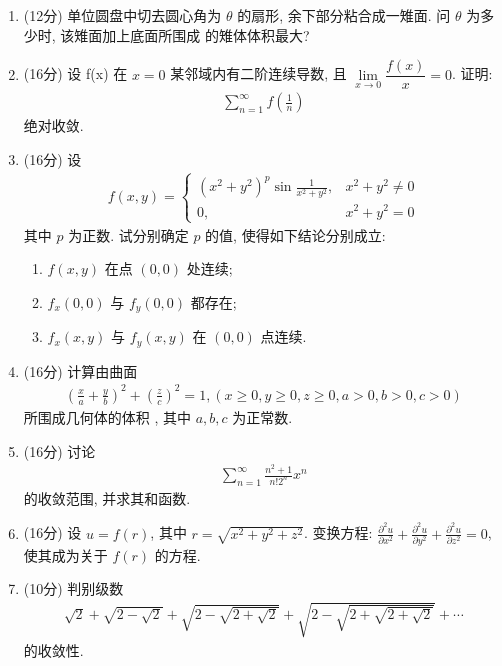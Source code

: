 \documentclass[space]{ctexart} %
\def\geq{\geqslant}
\begin{document}
\begin{enumerate}[itemsep=1.5em,label=\arabic*.,topsep=0pt,left=0em]
\begin{enumerate}[itemsep=1em,label=(\arabic*),topsep=0pt,left=2em]
\end{enumerate}



\item (12分) 单位圆盘中切去圆心角为  $\theta$  的扇形, 余下部分粘合成一雉面. 问  $\theta$ 为多少时, 该雉面加上底面所围成
的雉体体积最大?

\item (16分) 设 f(x) 在 $x=0$ 某邻域内有二阶连续导数, 且 $\lim\limits_{x \rightarrow 0} \dfrac{f(x)}{x}=0$.  证明:
\begin{align*}
    \sum_{n=1}^{\infty} f\left(\frac{1}{n}\right)
\end{align*}
绝对收敛.

\item (16分) 设
\begin{align*}
    f(x, y)=\begin{cases}
\left(x^{2}+y^{2}\right)^{p} \sin \frac{1}{x^{2}+y^{2}}, & x^{2}+y^{2} \neq 0 \\
0, & x^{2}+y^{2}=0
\end{cases}
\end{align*}
其中  $p$ 为正数. 试分别确定 $p$ 的值, 使得如下结论分别成立:
\begin{enumerate}[itemsep=0em,label=(\arabic*),topsep=0pt,left=0em]
\item  $f(x, y)$  在点  $(0,0)$  处连续;
\item   $f_{x}(0,0)$  与  $f_{y}(0,0)$  都存在;
\item   $f_{x}(x, y)$  与  $f_{y}(x, y)$  在  $(0,0)$  点连续.
\end{enumerate}

\item (16分) 计算由曲面
\begin{align*}
    \left(\frac{x}{a}+\frac{y}{b}\right)^{2}+\left(\frac{z}{c}\right)^{2}=1,(x \geq 0, y \geq 0, z \geq 0, a>0, b>0, c>0)
\end{align*}
所围成几何体的体积 , 其中 $a,b,c$ 为正常数.

\item (16分) 讨论
\begin{align*}
    \sum_{n=1}^{\infty} \frac{n^{2}+1}{n ! 2^{n}} x^{n}
\end{align*}
的收敛范围, 并求其和函数.


\item (16分)  设 $ u=f(r)$, 其中  $r=\sqrt{x^{2}+y^{2}+z^{2}}$. 变换方程:  $\frac{\partial^{2} u}{\partial x^{2}}+\frac{\partial^{2} u}{\partial y^{2}}+\frac{\partial^{2} u}{\partial z^{2}}=0$, 使其成为关于  $f(r)$ 的方程.

\newpage
\item (10分) 判别级数
\begin{align*}
   \sqrt{2}+\sqrt{2-\sqrt{2}}+\sqrt{2-\sqrt{2+\sqrt{2}}}+\sqrt{2-\sqrt{2+\sqrt{2+\sqrt{2}}}}+\cdots
\end{align*}
的收敛性.


\end{enumerate}
\end{document}
